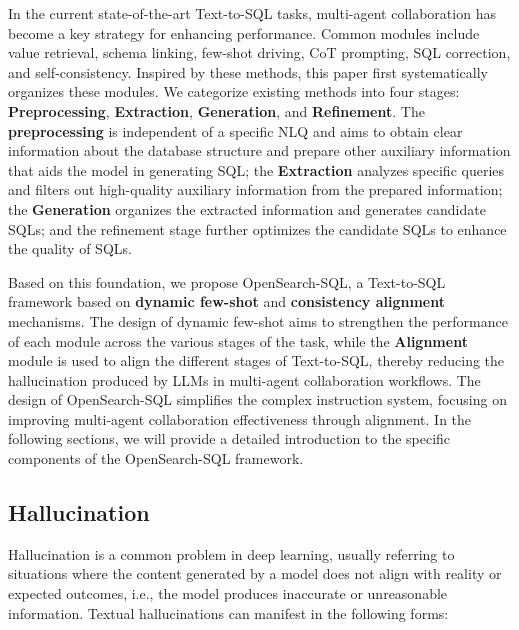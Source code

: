 

In the current state-of-the-art Text-to-SQL tasks, multi-agent collaboration has become a key strategy for enhancing performance. Common modules include value retrieval, schema linking, few-shot driving, CoT prompting, SQL correction, and self-consistency. Inspired by these methods, this paper first systematically organizes these modules. We categorize existing methods into four stages: \textbf{Preprocessing}, \textbf{Extraction},\textbf{ Generation}, and \textbf{Refinement}. The \textbf{preprocessing} is independent of a specific NLQ and aims to obtain clear information about the database structure and prepare other auxiliary information that aids the model in generating SQL; the \textbf{Extraction} analyzes specific queries and filters out high-quality auxiliary information from the prepared information; the\textbf{ Generation} organizes the extracted information and generates candidate SQLs; and the refinement stage further optimizes the candidate SQLs to enhance the quality of SQLs.

Based on this foundation, we propose OpenSearch-SQL, a Text-to-SQL framework based on \textbf{dynamic few-shot} and \textbf{consistency alignment} mechanisms. The design of dynamic few-shot aims to strengthen the performance of each module across the various stages of the task, while the \textbf{Alignment} module is used to align the different stages of Text-to-SQL, thereby reducing the hallucination produced by LLMs in multi-agent collaboration workflows. The design of OpenSearch-SQL simplifies the complex instruction system, focusing on improving multi-agent collaboration effectiveness through alignment. In the following sections, we will provide a detailed introduction to the specific components of the OpenSearch-SQL framework.


\subsection{Hallucination}
Hallucination \cite{hallucination} is a common problem in deep learning, usually referring to situations where the content generated by a model does not align with reality or expected outcomes, i.e., the model produces inaccurate or unreasonable information. Textual hallucinations can manifest in the following forms:

